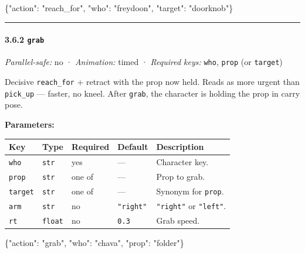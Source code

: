 \documentclass[
  12pt,
  letterpaper,
]{book}
\newenvironment{Shaded}{}{}
\newcommand{\DataTypeTok}[1]{\textcolor[rgb]{0.56,0.13,0.00}{#1}}
\newcommand{\FunctionTok}[1]{\textcolor[rgb]{0.02,0.16,0.49}{#1}}
\newcommand{\StringTok}[1]{\textcolor[rgb]{0.25,0.44,0.63}{#1}}
\begin{document}
\begin{Shaded}
\begin{Highlighting}[]
\FunctionTok{\{}\DataTypeTok{"action"}\FunctionTok{:} \StringTok{"reach\_for"}\FunctionTok{,} \DataTypeTok{"who"}\FunctionTok{:} \StringTok{"freydoon"}\FunctionTok{,} \DataTypeTok{"target"}\FunctionTok{:} \StringTok{"doorknob"}\FunctionTok{\}}
\end{Highlighting}
\end{Shaded}

\begin{center}\rule{0.5\linewidth}{0.5pt}\end{center}

\paragraph{\texorpdfstring{3.6.2 \texttt{grab}}{3.6.2 grab}}\label{grab}

\emph{Parallel-safe:} no · \emph{Animation:} timed · \emph{Required
keys:} \texttt{who}, \texttt{prop} (or \texttt{target})

Decisive \texttt{reach\_for} + retract with the prop now held. Reads as
more urgent than \texttt{pick\_up} --- faster, no kneel. After
\texttt{grab}, the character is holding the prop in carry pose.

\textbf{Parameters:}

\begin{longtable}[]{@{}lllll@{}}
\toprule\noalign{}
Key & Type & Required & Default & Description \\
\midrule\noalign{}
\endhead
\bottomrule\noalign{}
\endlastfoot
\texttt{who} & \texttt{str} & yes & --- & Character key. \\
\texttt{prop} & \texttt{str} & one of & --- & Prop to grab. \\
\texttt{target} & \texttt{str} & one of & --- & Synonym for
\texttt{prop}. \\
\texttt{arm} & \texttt{str} & no & \texttt{"right"} & \texttt{"right"}
or \texttt{"left"}. \\
\texttt{rt} & \texttt{float} & no & \texttt{0.3} & Grab speed. \\
\end{longtable}

\begin{Shaded}
\begin{Highlighting}[]
\FunctionTok{\{}\DataTypeTok{"action"}\FunctionTok{:} \StringTok{"grab"}\FunctionTok{,} \DataTypeTok{"who"}\FunctionTok{:} \StringTok{"chava"}\FunctionTok{,} \DataTypeTok{"prop"}\FunctionTok{:} \StringTok{"folder"}\FunctionTok{\}}
\end{Highlighting}
\end{Shaded}
\end{document}
